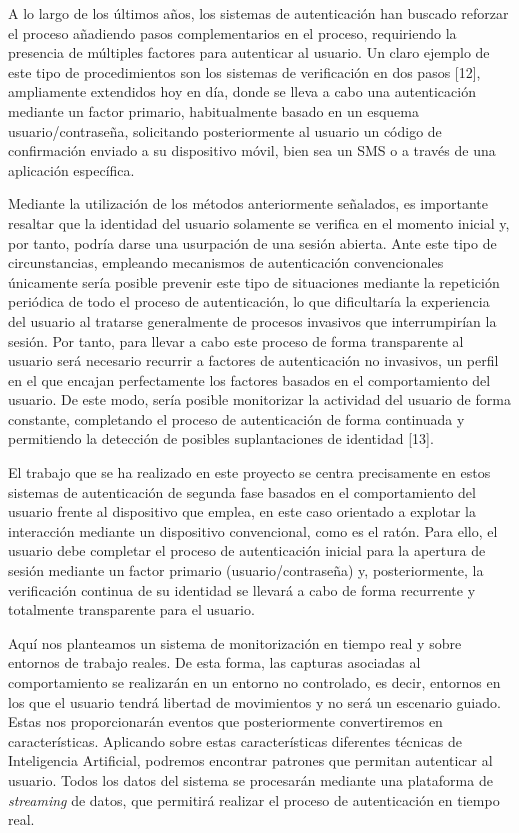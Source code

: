 A lo largo de los últimos años, los sistemas de autenticación han buscado reforzar el proceso añadiendo pasos complementarios en el proceso, requiriendo la presencia de múltiples factores para autenticar al usuario. Un claro ejemplo de este tipo de procedimientos son los sistemas de verificación en dos pasos [12], ampliamente extendidos hoy en día, donde se lleva a cabo una autenticación mediante un factor primario, habitualmente basado en un esquema usuario/contraseña, solicitando posteriormente al usuario un código de confirmación enviado a su dispositivo móvil, bien sea un SMS o a través de una aplicación específica.

Mediante la utilización de los métodos anteriormente señalados, es importante resaltar que la identidad del usuario solamente se verifica en el momento inicial y, por tanto, podría darse una usurpación de una sesión abierta. Ante este tipo de circunstancias, empleando mecanismos de autenticación convencionales únicamente sería posible prevenir este tipo de situaciones mediante la repetición periódica de todo el proceso de autenticación, lo que dificultaría la experiencia del usuario al tratarse generalmente de procesos invasivos que interrumpirían la sesión. Por tanto, para llevar a cabo este proceso de forma transparente al usuario será necesario recurrir a factores de autenticación no invasivos, un perfil en el que encajan perfectamente los factores basados en el comportamiento del usuario. De este modo, sería posible monitorizar la actividad del usuario de forma constante, completando el proceso de autenticación de forma continuada y permitiendo la detección de posibles suplantaciones de identidad [13].

El trabajo que se ha realizado en este proyecto se centra precisamente en estos sistemas de autenticación de segunda fase basados en el comportamiento del usuario frente al dispositivo que emplea, en este caso orientado a explotar la interacción mediante un dispositivo convencional, como es el ratón. Para ello, el usuario debe completar el proceso de autenticación inicial para la apertura de sesión mediante un factor primario (usuario/contraseña) y, posteriormente, la verificación continua de su identidad se llevará a cabo de forma recurrente y totalmente transparente para el usuario.

Aquí nos planteamos un sistema de monitorización en tiempo real y sobre entornos de trabajo reales. De esta forma, las capturas asociadas al comportamiento se realizarán en un entorno no controlado, es decir, entornos en los que el usuario tendrá libertad de movimientos y no será un escenario guiado. Estas nos proporcionarán eventos que posteriormente convertiremos en características. Aplicando sobre estas características diferentes técnicas de Inteligencia Artificial, podremos encontrar patrones que permitan autenticar al usuario. Todos los datos del sistema se procesarán mediante una plataforma de \textit{streaming} de datos, que permitirá realizar el proceso de autenticación en tiempo real. 


